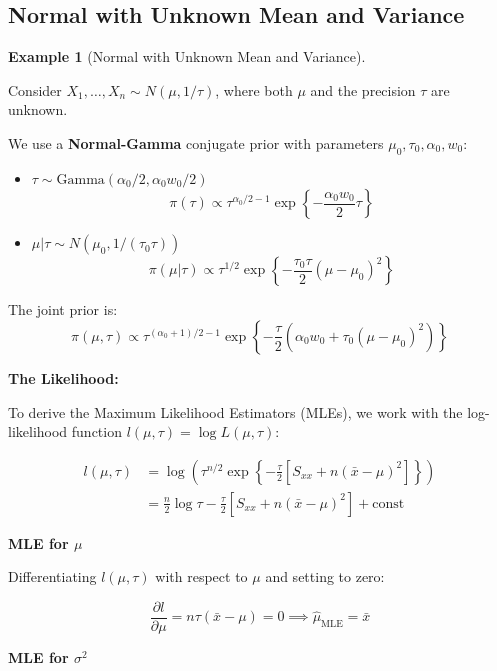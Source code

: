 \documentclass[
  letterpaper,
  DIV=11,
  numbers=noendperiod]{scrreprt}
\renewcommand{\[}{\begin{equation}}
\renewcommand{\]}{\end{equation}}
\theoremstyle{definition}
\theoremstyle{plain}
\theoremstyle{plain}
\theoremstyle{plain}
\theoremstyle{definition}
\newtheorem{example}{Example}[chapter]
\theoremstyle{plain}
\theoremstyle{remark}
\begin{document}
\subsection{Normal with Unknown Mean and
Variance}\label{normal-with-unknown-mean-and-variance}

\begin{example}[Normal with Unknown Mean and
Variance]\protect\hypertarget{exm-Normal-with-Unknown-Mean-and-Variance}{}\label{exm-Normal-with-Unknown-Mean-and-Variance}

Consider \(X_1, \dots, X_n \sim N(\mu, 1/\tau)\), where both \(\mu\) and
the precision \(\tau\) are unknown.

We use a \textbf{Normal-Gamma} conjugate prior with parameters
\(\mu_0, \tau_0, \alpha_0, w_0\):

\begin{itemize}
\item
  \(\tau \sim \text{Gamma}(\alpha_0/2, \alpha_0 w_0/2)\)
  \[ \pi(\tau) \propto \tau^{\alpha_0/2 - 1} \exp\left\{ -\frac{\alpha_0 w_0}{2} \tau \right\} \]
\item
  \(\mu|\tau \sim N(\mu_0, 1/(\tau_0\tau))\)
  \[ \pi(\mu|\tau) \propto \tau^{1/2} \exp\left\{ -\frac{\tau_0\tau}{2}(\mu-\mu_0)^2 \right\} \]
\end{itemize}

The joint prior is: \[
\pi(\mu, \tau) \propto \tau^{(\alpha_0+1)/2 - 1} \exp\left\{ -\frac{\tau}{2} \left( \alpha_0 w_0 + \tau_0(\mu - \mu_0)^2 \right) \right\}
\]

\textbf{The Likelihood:}

To derive the Maximum Likelihood Estimators (MLEs), we work with the
log-likelihood function \(l(\mu, \tau) = \log L(\mu, \tau)\):

\[
\begin{aligned}
l(\mu, \tau) &= \log \left( \tau^{n/2} \exp\left\{ -\frac{\tau}{2} [ S_{xx} + n(\bar{x}-\mu)^2 ] \right\} \right) \\
&= \frac{n}{2} \log \tau - \frac{\tau}{2} \left[ S_{xx} + n(\bar{x}-\mu)^2 \right] + \text{const}
\end{aligned}
\]

\textbf{MLE for \(\mu\)}

Differentiating \(l(\mu, \tau)\) with respect to \(\mu\) and setting to
zero:

\[
\frac{\partial l}{\partial \mu} = n\tau(\bar{x} - \mu) = 0 \implies \hat{\mu}_{\text{MLE}} = \bar{x}
\]

\textbf{MLE for \(\sigma^2\)}


\end{example}
\end{document}
